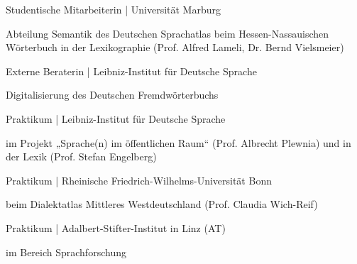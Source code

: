 \documentclass[11pt, a4paper, notopicbreak, titleabove]{simplecv}
\begin{document}
\begin{topic}
	\item[2022-- 2023]
		Studentische Mitarbeiterin {\color{SpotColor}|} Universität Marburg \par
		\begingroup
			\color{QueenslandGrey}\small%
			\selectfont%
			Abteilung Semantik des Deutschen Sprachatlas beim Hessen-Nassauischen Wörterbuch in der Lexikographie (Prof. Alfred Lameli, Dr. Bernd Vielsmeier)\\  
		\endgroup
\end{topic}

\begin{topic}
	\item[2022]
		Externe Beraterin {\color{SpotColor}|} Leibniz-Institut für Deutsche Sprache \par
		\begingroup
			\color{QueenslandGrey}\small%
			\selectfont%
			Digitalisierung des Deutschen Fremdwörterbuchs\\  
		\endgroup
\end{topic}

\begin{topic}
	\item[2022]
		Praktikum {\color{SpotColor}|} Leibniz-Institut für Deutsche Sprache \par
		\begingroup
			\color{QueenslandGrey}\small%
			\selectfont%
			im Projekt „Sprache(n) im öffentlichen Raum“ (Prof. Albrecht Plewnia) und in der Lexik (Prof. Stefan Engelberg)\\  
		\endgroup
\end{topic}

\begin{topic}
	\item[2020]
		Praktikum {\color{SpotColor}|} Rheinische Friedrich-Wilhelms-Universität Bonn \par
		\begingroup
			\color{QueenslandGrey}\small%
			\selectfont%
			beim Dialektatlas Mittleres Westdeutschland (Prof. Claudia Wich-Reif)\\  
		\endgroup
\end{topic}

\begin{topic}
	\item[2020]
		Praktikum {\color{SpotColor}|} Adalbert-Stifter-Institut in Linz (AT)  \par
		\begingroup
			\color{QueenslandGrey}\small%
			\selectfont%
			im Bereich Sprachforschung\\  
		\endgroup
\end{topic}
\end{document}
